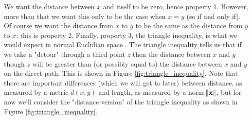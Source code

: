 \documentclass{article}
\theoremstyle{definition}
\begin{document}
\vspace{1.5em}
\noindent
We want the distance between $x$ and itself to be zero, hence
property 1. However, more than that we want this only to be the
case when $x = y$ (so if and only if). Of course we want the
distance from $x$ to $y$ to be the same as the distance from $y$
to $x$; this is property 2.  Finally, property 3, the triangle
inequality, is what we would expect in normal Euclidian space
\cite{euclidian_space}. The triangle inequality tells us that if
we take a "detour" through a third point $z$ then the distance
between $x$ and $y$ though $z$ will be greater than (or possibly
equal to) the distance between $x$ and $y$ on the direct path.
This is shown in Figure \ref{fig:triangle_inequality}. Note 
that there are important differences (which we will get to later) 
between distance, as measured by a metric $d(x,y)$ and length, 
as measured by a norm $\norm{\mathbf{x}}$, but for now we'll
consider the "distance version" of the triangle inequality as
shown in Figure \ref{fig:triangle_inequality}.
\end{document}
